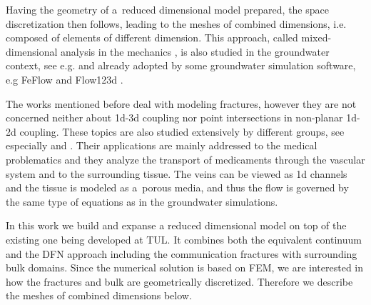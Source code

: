 Having the geometry of a~reduced dimensional model prepared, the space discretization then follows,
leading to the meshes of combined dimensions, i.e. composed of elements of different dimension.
This approach, called mixed-dimensional analysis in the mechanics \cite{bournival_mesh-geometry_2008},
is also studied in the groundwater context, see e.g. \cite{martin_modeling_2005, fumagalli_numerical_2011, dangelo_mixed_2012, brezina_analysis_2015}
and already adopted by some groundwater simulation software, e.g FeFlow \cite{trefry_feflow_2007} and Flow123d \cite{flow123d}.

The works mentioned before deal with modeling fractures, however they are not concerned neither about 1d-3d coupling
nor point intersections in non-planar 1d-2d coupling. These topics are also studied extensively by different groups, see
especially \cite{dangelo_coupling_2008, cattaneo_numerical_2015} and \cite{koppl_tum_2015, koppl_vidotto_2018}.
Their applications are mainly addressed to the medical problematics and they analyze the transport of medicaments through
the vascular system and to the surrounding tissue. The veins can be viewed as 1d channels and the tissue is modeled as a~porous media,
and thus the flow is governed by the same type of equations as in the groundwater simulations.

In this work we build and expanse a reduced dimensional model on top of the existing one being developed at TUL.
It combines both the equivalent continuum and the DFN approach including the communication fractures with surrounding bulk domains.
Since the numerical solution is based on FEM, we are interested in how the fractures and bulk are geometrically discretized.
Therefore we describe the meshes of combined dimensions below.



